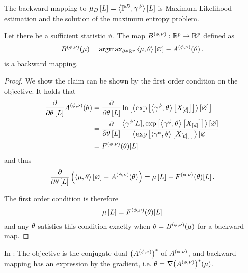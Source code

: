 The backward mapping to $\mu_{D}\left[L\right] = \left\langle \mathbb{P}^{D},\gamma^{\phi}\right\rangle \left[ L \right]$ is Maximum Likelihood estimation and the solution of the maximum entropy problem.

\begin{theorem}\label{the:varBackward}
	Let there be a sufficient statistic $\phi$.
	The map $B^{(\phi,\nu)}: \mathbb{R}^{p}\rightarrow \mathbb{R}^{p}$ defined as
	\begin{align*}
		B^{(\phi,\nu)}(\mu)
		= \mathrm{argmax}_{\theta\in\mathbb{R}^{p}}  \left\langle \mu,\theta\right\rangle \left[ \varnothing \right] - A^{(\phi,\nu)}(\theta) \, . 
	\end{align*}
	is a backward mapping.
\end{theorem}
\begin{proof}
	We show the claim can be shown by the first order condition on the objective.	
	It holds that
	\begin{align*}
		\frac{\partial }{\partial \theta\left[L\right]}  A^{(\phi,\nu)}(\theta)  
		 & = \frac{\partial }{\partial \theta\left[L\right]}  \ln \left[ \left\langle \mathrm{exp}\left[\left\langle \gamma^{\phi},\theta\right\rangle \left[ X_{[d]} \right]\right]\right\rangle \left[ \varnothing \right] \right] \\
		 & = \frac{\partial }{\partial \theta\left[L\right]} \frac{\left\langle \gamma^{\phi}[L],\mathrm{exp}\left[\left\langle \gamma^{\phi},\theta\right\rangle \left[ X_{[d]} \right]\right]\right\rangle \left[ \varnothing \right]}{\left\langle \mathrm{exp}\left[\left\langle \gamma^{\phi},\theta\right\rangle \left[ X_{[d]} \right]\right]\right\rangle \left[ \varnothing \right]}   \\
		 & = F^{(\phi,\nu)}(\theta)[L]
	\end{align*}
	and thus
	\begin{align*}
		\frac{\partial }{\partial \theta\left[L\right]} \left( \left\langle \mu,\theta\right\rangle \left[ \varnothing \right] - A^{(\phi,\nu)}(\theta)  \right) 
		= \mu\left[L\right] -  F^{(\phi,\nu)}(\theta)[L] \, . 
	\end{align*}
	
	The first order condition is therefore 
		\[ \mu\left[L\right] =  F^{(\phi,\nu)}(\theta)[L] \]
	and any $\theta$ satisfies this condition exactly when $\theta=B^{(\phi,\nu)}(\mu)$ for a backward map.
\end{proof}

In \cite{wainwright_graphical_2008}:
The objective is the conjugate dual $\big(A^{(\phi,\nu)}\big)^*$ of $A^{(\phi,\nu)}$, and backward mapping has an expression by the gradient, i.e. $\theta = \nabla \big(A^{(\phi,\nu)}\big)^*(\mu)$.





